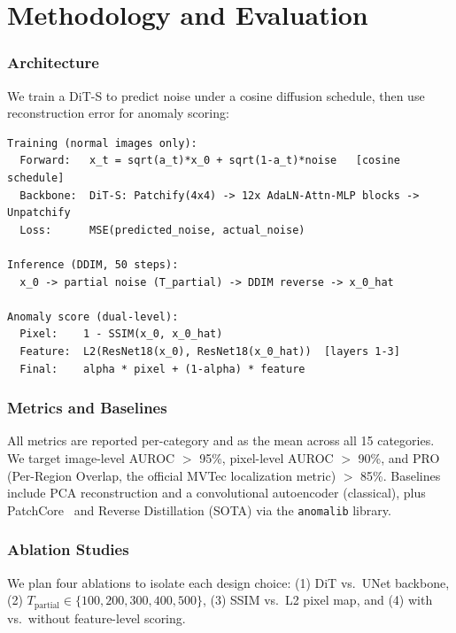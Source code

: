 \documentclass[12pt,a4paper]{article}
\begin{document}
\section{Methodology and Evaluation}

\subsubsection*{Architecture}

We train a DiT-S to predict noise under a cosine diffusion schedule, then use
reconstruction error for anomaly scoring:

\begin{lstlisting}
Training (normal images only):
  Forward:   x_t = sqrt(a_t)*x_0 + sqrt(1-a_t)*noise   [cosine schedule]
  Backbone:  DiT-S: Patchify(4x4) -> 12x AdaLN-Attn-MLP blocks -> Unpatchify
  Loss:      MSE(predicted_noise, actual_noise)

Inference (DDIM, 50 steps):
  x_0 -> partial noise (T_partial) -> DDIM reverse -> x_0_hat

Anomaly score (dual-level):
  Pixel:    1 - SSIM(x_0, x_0_hat)
  Feature:  L2(ResNet18(x_0), ResNet18(x_0_hat))  [layers 1-3]
  Final:    alpha * pixel + (1-alpha) * feature
\end{lstlisting}

\subsubsection*{Metrics and Baselines}

All metrics are reported per-category and as the mean across all 15 categories.
We target image-level AUROC $>$ 95\%, pixel-level AUROC $>$ 90\%, and
PRO (Per-Region Overlap, the official MVTec localization metric) $>$ 85\%.
Baselines include PCA reconstruction and a convolutional autoencoder (classical),
plus PatchCore~\cite{roth2022} and Reverse Distillation (SOTA) via the
\texttt{anomalib} library.

\subsubsection*{Ablation Studies}

We plan four ablations to isolate each design choice: (1) DiT vs.\ UNet
backbone, (2) $T_{\text{partial}} \in \{100,200,300,400,500\}$, (3) SSIM vs.\
L2 pixel map, and (4) with vs.\ without feature-level scoring.
\end{document}
